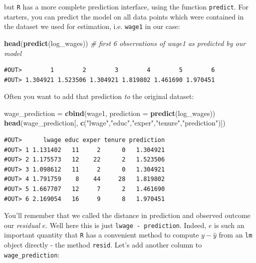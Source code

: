\documentclass[]{book}
\newenvironment{Shaded}{\begin{snugshade}}{\end{snugshade}}
\newcommand{\CommentTok}[1]{\textcolor[rgb]{0.56,0.35,0.01}{\textit{#1}}}
\newcommand{\DataTypeTok}[1]{\textcolor[rgb]{0.13,0.29,0.53}{#1}}
\newcommand{\KeywordTok}[1]{\textcolor[rgb]{0.13,0.29,0.53}{\textbf{#1}}}
\newcommand{\NormalTok}[1]{#1}
\newcommand{\StringTok}[1]{\textcolor[rgb]{0.31,0.60,0.02}{#1}}
\begin{document}
but \texttt{R} has a more complete prediction interface, using the function \texttt{predict}. For starters, you can predict the model on all data points which were contained in the dataset we used for estimation, i.e. \texttt{wage1} in our case:

\begin{Shaded}
\begin{Highlighting}[]
\KeywordTok{head}\NormalTok{(}\KeywordTok{predict}\NormalTok{(log_wages))  }\CommentTok{# first 6 observations of wage1 as predicted by our model}
\end{Highlighting}
\end{Shaded}

\begin{verbatim}
#OUT>        1        2        3        4        5        6 
#OUT> 1.304921 1.523506 1.304921 1.819802 1.461690 1.970451
\end{verbatim}

Often you want to add that prediction \emph{to} the original dataset:

\begin{Shaded}
\begin{Highlighting}[]
\NormalTok{wage_prediction =}\StringTok{ }\KeywordTok{cbind}\NormalTok{(wage1, }\DataTypeTok{prediction =} \KeywordTok{predict}\NormalTok{(log_wages))}
\KeywordTok{head}\NormalTok{(wage_prediction[, }\KeywordTok{c}\NormalTok{(}\StringTok{"lwage"}\NormalTok{,}\StringTok{"educ"}\NormalTok{,}\StringTok{"exper"}\NormalTok{,}\StringTok{"tenure"}\NormalTok{,}\StringTok{"prediction"}\NormalTok{)])}
\end{Highlighting}
\end{Shaded}

\begin{verbatim}
#OUT>      lwage educ exper tenure prediction
#OUT> 1 1.131402   11     2      0   1.304921
#OUT> 2 1.175573   12    22      2   1.523506
#OUT> 3 1.098612   11     2      0   1.304921
#OUT> 4 1.791759    8    44     28   1.819802
#OUT> 5 1.667707   12     7      2   1.461690
#OUT> 6 2.169054   16     9      8   1.970451
\end{verbatim}

You'll remember that we called the distance in prediction and observed outcome our \emph{residual} \(e\). Well here this is just \texttt{lwage\ -\ prediction}. Indeed, \(e\) is such an important quantity that \texttt{R} has a convenient method to compute \(y - \hat{y}\) from an \texttt{lm} object directly - the method \texttt{resid}. Let's add another column to \texttt{wage\_prediction}:
\end{document}
